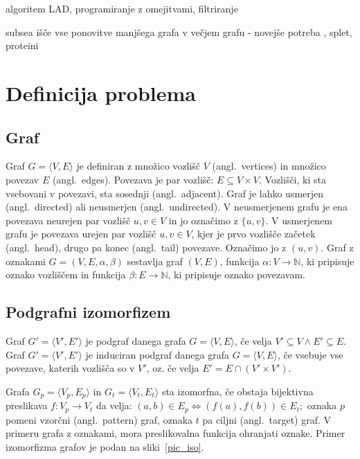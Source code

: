 \documentclass[a4paper, 12pt, ]{book}
\begin{document}
\cite{zampelli-th}
\cite{alldiff}  algoritem LAD, programiranje z omejitvami, filtriranje

subsea išče vse ponovitve manjšega grafa v večjem grafu - novejše potreba , splet, proteini



\chapter{Definicija problema}

	\section{Graf}
	Graf $G = \langle V, E \rangle$ je definiran z množico vozlišč $V$ (angl.~vertices) in množico povezav $E$ (angl.~edges). Povezava je par vozlišč: 
	$E \subseteq V \times V$.
	Vozlišči, ki sta vsebovani v povezavi, sta sosednji (angl.~adjacent). Graf je lahko usmerjen (angl.~directed) ali neusmerjen
	(angl.~undirected). V neusmerjenem
	grafu je ena povezava neurejen par vozlišč $u, v \in V$ in jo označimo z $\{u, v\}$. V usmerjenem grafu je povezava urejen par 
	vozlišč $u, v \in V$, kjer je prvo vozlišče začetek (angl.~head), drugo pa konec (angl.~tail) povezave. Označimo jo z $(u, v)$.
	Graf z oznakami $G = (V, E, \alpha, \beta)$ sestavlja graf $(V, E)$, funkcija $\alpha: V \to \mathbb{N} $, ki pripisuje oznako
	vozliščem in funkcija $\beta: E \rightarrow \mathbb{N}$, ki pripisuje oznako povezavam.



	\section{Podgrafni izomorfizem}
	Graf $G' = \langle V', E' \rangle$ je podgraf danega grafa $G = \langle V, E \rangle$, če velja $V' \subseteq V \wedge E' \subseteq E$. 
	Graf $G' = \langle V', E' \rangle$ je induciran podgraf danega grafa $G = \langle V, E \rangle$, če vsebuje vse povezave, katerih vozlišča so
	v $V'$, oz. če velja $E' = E \cap (V' \times V')$.

	Grafa $G_p = \langle V_p, E_p \rangle $ in $G_t = \langle V_t, E_t \rangle$ sta izomorfna, če obstaja bijektivna preslikava $f: V_p \to V_t$ da velja: 
	$(a,b) \in E_p \Leftrightarrow (f(a), f(b)) \in E_t;$
	oznaka $p$ pomeni vzorčni (angl.~pattern) graf, oznaka $t$ pa ciljni (angl.~target) graf. V primeru grafa z oznakami, mora preslikovalna funkcija
	ohranjati oznake. Primer izomorfizma grafov je podan na sliki~\ref{pic_iso}.
\end{document}
